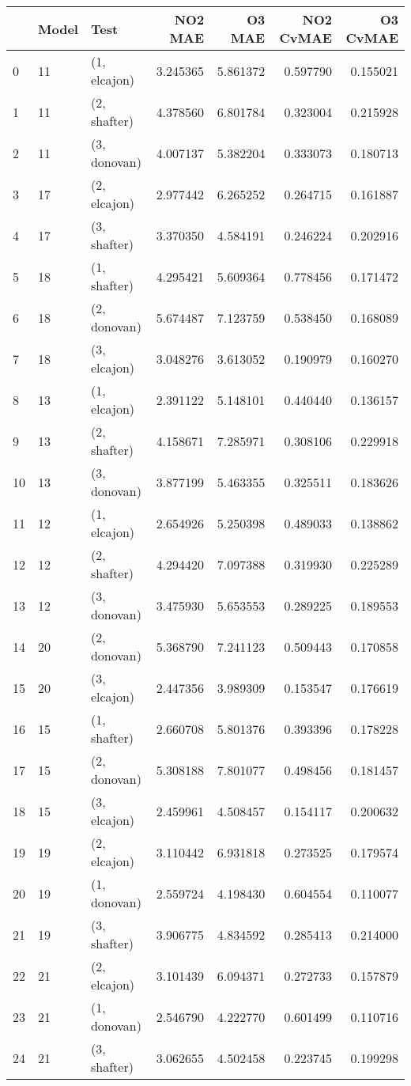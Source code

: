 \begin{tabular}{lllrrrr}
\toprule
{} & Model &          Test &   NO2 MAE &    O3 MAE &  NO2 CvMAE &  O3 CvMAE \\
\midrule
0  &    11 &  (1, elcajon) &  3.245365 &  5.861372 &   0.597790 &  0.155021 \\
1  &    11 &  (2, shafter) &  4.378560 &  6.801784 &   0.323004 &  0.215928 \\
2  &    11 &  (3, donovan) &  4.007137 &  5.382204 &   0.333073 &  0.180713 \\
3  &    17 &  (2, elcajon) &  2.977442 &  6.265252 &   0.264715 &  0.161887 \\
4  &    17 &  (3, shafter) &  3.370350 &  4.584191 &   0.246224 &  0.202916 \\
5  &    18 &  (1, shafter) &  4.295421 &  5.609364 &   0.778456 &  0.171472 \\
6  &    18 &  (2, donovan) &  5.674487 &  7.123759 &   0.538450 &  0.168089 \\
7  &    18 &  (3, elcajon) &  3.048276 &  3.613052 &   0.190979 &  0.160270 \\
8  &    13 &  (1, elcajon) &  2.391122 &  5.148101 &   0.440440 &  0.136157 \\
9  &    13 &  (2, shafter) &  4.158671 &  7.285971 &   0.308106 &  0.229918 \\
10 &    13 &  (3, donovan) &  3.877199 &  5.463355 &   0.325511 &  0.183626 \\
11 &    12 &  (1, elcajon) &  2.654926 &  5.250398 &   0.489033 &  0.138862 \\
12 &    12 &  (2, shafter) &  4.294420 &  7.097388 &   0.319930 &  0.225289 \\
13 &    12 &  (3, donovan) &  3.475930 &  5.653553 &   0.289225 &  0.189553 \\
14 &    20 &  (2, donovan) &  5.368790 &  7.241123 &   0.509443 &  0.170858 \\
15 &    20 &  (3, elcajon) &  2.447356 &  3.989309 &   0.153547 &  0.176619 \\
16 &    15 &  (1, shafter) &  2.660708 &  5.801376 &   0.393396 &  0.178228 \\
17 &    15 &  (2, donovan) &  5.308188 &  7.801077 &   0.498456 &  0.181457 \\
18 &    15 &  (3, elcajon) &  2.459961 &  4.508457 &   0.154117 &  0.200632 \\
19 &    19 &  (2, elcajon) &  3.110442 &  6.931818 &   0.273525 &  0.179574 \\
20 &    19 &  (1, donovan) &  2.559724 &  4.198430 &   0.604554 &  0.110077 \\
21 &    19 &  (3, shafter) &  3.906775 &  4.834592 &   0.285413 &  0.214000 \\
22 &    21 &  (2, elcajon) &  3.101439 &  6.094371 &   0.272733 &  0.157879 \\
23 &    21 &  (1, donovan) &  2.546790 &  4.222770 &   0.601499 &  0.110716 \\
24 &    21 &  (3, shafter) &  3.062655 &  4.502458 &   0.223745 &  0.199298 \\
\bottomrule
\end{tabular}
